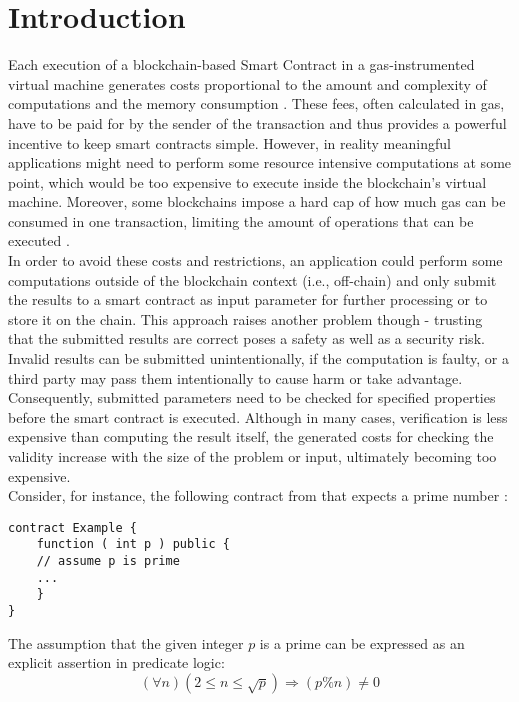 \chapter{Introduction}\label{chap:introduction}
Each execution of a blockchain-based Smart Contract in a gas-instrumented virtual machine generates costs proportional to the amount and complexity of computations and the  memory consumption \cite{goodman_tezos_2014}\cite{wood_ethereum_2021}. These fees, often calculated in gas, have to be paid for by the sender of the transaction and thus provides a powerful incentive to keep  smart contracts simple. However, in reality meaningful applications might need to perform some resource intensive computations at some point, which would be too expensive to execute inside the blockchain's virtual machine. Moreover, some blockchains impose a hard cap of how much gas can be consumed in one transaction, limiting the amount of operations that can be executed \cite{goodman_tezos_2014}.\\
In order to avoid these costs and restrictions, an application could perform some computations outside of the blockchain context (i.e., off-chain) and only submit the results to a smart contract as input parameter for further processing or to store it on the chain. This approach raises another problem though - trusting that the submitted results are correct poses a safety as well as a security risk. Invalid results can be submitted unintentionally, if the computation is faulty, or a third party may pass them intentionally to cause harm or take advantage. Consequently, submitted parameters need to be checked for specified properties before the smart contract is executed. Although in many cases, verification is less expensive than computing the result itself, the generated costs for checking the validity increase with the size of the problem or input, ultimately becoming too expensive. \\
Consider, for instance, the following contract from \cite{thiemann_2020} that expects a prime number :
\begin{lstlisting}[caption=Smart contract expecting a prime number, numbers=none, language=Solidity, label=lst:prime]
contract Example {
	function ( int p ) public {
	// assume p is prime
	...
	}
}
\end{lstlisting}

The assumption that the given integer $p$ is a prime can be expressed as an explicit assertion in predicate logic: 
\begin{equation}\label{eq:prime}
    (\forall n) (2 \le n \le \sqrt{p}) \Rightarrow (p \% n) \neq 0
\end{equation}

